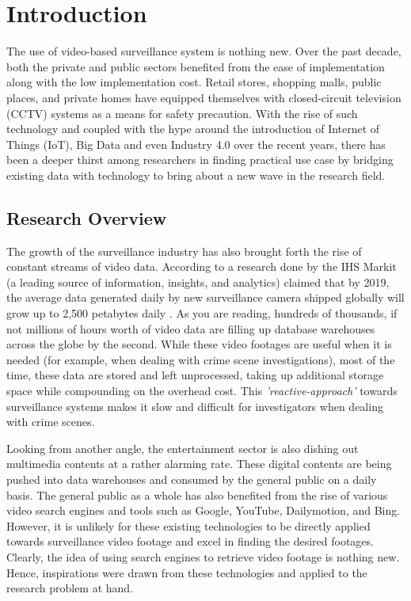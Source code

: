 \chapter{Introduction}
The use of video-based surveillance system is nothing new. Over the past decade, both the private and public sectors benefited from the ease of implementation along with the low implementation cost.
Retail stores, shopping malls, public places, and private homes have equipped themselves with closed-circuit television (CCTV) systems as a means for safety precaution.
With the rise of such technology and coupled with the hype around the introduction of Internet of Things (IoT), Big Data and even Industry 4.0 over the recent years, there has been a deeper thirst among researchers in finding practical use case by bridging existing data with technology to bring about a new wave in the research field.

\section{Research Overview}
\label{section:introduction}

The growth of the surveillance industry has also brought forth the rise of constant streams of video data. According to a research done by the IHS Markit (a leading source of information, insights, and analytics) claimed that by 2019, the average data generated daily by new surveillance camera shipped globally will grow up to 2,500 petabytes daily \cite{woodhouse2016big}.
As you are reading, hundreds of thousands, if not millions of hours worth of video data are filling up database warehouses across the globe by the second. While these video footages are useful when it is needed (for example, when dealing with crime scene investigations), most of the time, these data are stored and left unprocessed, taking up additional storage space while compounding on the overhead cost.
This \textit{'reactive-approach'} towards surveillance systems makes it slow and difficult for investigators when dealing with crime scenes.

Looking from another angle, the entertainment sector is also dishing out multimedia contents at a rather alarming rate. These digital contents are being pushed into data warehouses and consumed by the general public on a daily basis. The general public as a whole has also benefited from the rise of various video search engines and tools such as Google, YouTube, Dailymotion, and Bing. However, it is unlikely for these existing technologies to be directly applied towards surveillance video footage and excel in finding the desired footages. Clearly, the idea of using search engines to retrieve video footage is nothing new. Hence, inspirations were drawn from these technologies and applied to the research problem at hand. %

